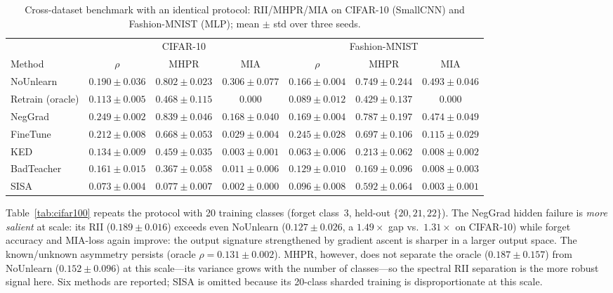 \documentclass[smallextended]{svjour3}       %
\begin{document}
\begin{table}[t]
\centering
\small
\caption{Cross-dataset benchmark with an identical protocol: RII/MHPR/MIA on CIFAR-10 (SmallCNN) and Fashion-MNIST (MLP); mean $\pm$ std over three seeds.}\label{tab:cross}
\setlength{\tabcolsep}{0pt}
\footnotesize
\begin{tabular}{l c c c | c c c}
\toprule
 & \multicolumn{3}{c|}{CIFAR-10} & \multicolumn{3}{c}{Fashion-MNIST} \\
Method & $\rho$ & MHPR & MIA & $\rho$ & MHPR & MIA \\
\midrule
NoUnlearn & $0.190{\pm}0.036$ & $0.802{\pm}0.023$ & $0.306{\pm}0.077$ & $0.166{\pm}0.004$ & $0.749{\pm}0.244$ & $0.493{\pm}0.046$ \\
Retrain (oracle) & $0.113{\pm}0.005$ & $0.468{\pm}0.115$ & 0.000 & $0.089{\pm}0.012$ & $0.429{\pm}0.137$ & 0.000 \\
NegGrad & $\mathbf{0.249{\pm}0.002}$ & $0.839{\pm}0.046$ & $0.168{\pm}0.040$ & $0.169{\pm}0.004$ & $0.787{\pm}0.197$ & $0.474{\pm}0.049$ \\
FineTune & $0.212{\pm}0.008$ & $0.668{\pm}0.053$ & $0.029{\pm}0.004$ & $0.245{\pm}0.028$ & $0.697{\pm}0.106$ & $0.115{\pm}0.029$ \\
KED & $0.134{\pm}0.009$ & $0.459{\pm}0.035$ & $0.003{\pm}0.001$ & $\mathbf{0.063{\pm}0.006}$ & $0.213{\pm}0.062$ & $0.008{\pm}0.002$ \\
BadTeacher & $0.161{\pm}0.015$ & $0.367{\pm}0.058$ & $0.011{\pm}0.006$ & $0.129{\pm}0.010$ & $0.169{\pm}0.096$ & $0.008{\pm}0.003$ \\
SISA & $0.073{\pm}0.004$ & $0.077{\pm}0.007$ & $0.002{\pm}0.000$ & $0.096{\pm}0.008$ & $0.592{\pm}0.064$ & $0.003{\pm}0.001$ \\
\bottomrule
\end{tabular}
\end{table}

Table~\ref{tab:cifar100} repeats the protocol with 20 training classes (forget class~3, held-out $\{20,21,22\}$). The NegGrad hidden failure is \emph{more salient} at scale: its RII ($0.189{\pm}0.016$) exceeds even NoUnlearn ($0.127{\pm}0.026$, a $1.49\times$ gap vs.\ $1.31\times$ on CIFAR-10) while forget accuracy and MIA-loss again improve: the output signature strengthened by gradient ascent is sharper in a larger output space. The known/unknown asymmetry persists (oracle $\rho{=}0.131{\pm}0.002$). MHPR, however, does not separate the oracle ($0.187{\pm}0.157$) from NoUnlearn ($0.152{\pm}0.096$) at this scale---its variance grows with the number of classes---so the spectral RII separation is the more robust signal here. Six methods are reported; SISA is omitted because its 20-class sharded training is disproportionate at this scale.
\end{document}
